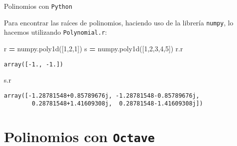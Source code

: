 \documentclass[
  ignorenonframetext,
]{beamer}
\newenvironment{Shaded}{\begin{snugshade}}{\end{snugshade}}
\newcommand{\DecValTok}[1]{\textcolor[rgb]{0.00,0.00,0.81}{#1}}
\newcommand{\NormalTok}[1]{#1}
\newcommand{\OperatorTok}[1]{\textcolor[rgb]{0.81,0.36,0.00}{\textbf{#1}}}
\begin{document}
\begin{frame}[fragile]{Polinomios con \texttt{Python}}
\protect\hypertarget{polinomios-con-python-11}{}

Para encontrar las raíces de polinomios, haciendo uso de la librería
\texttt{numpy}, lo hacemos utilizando \texttt{Polynomial.r}:

\begin{Shaded}
\begin{Highlighting}[]
\NormalTok{r }\OperatorTok{=}\NormalTok{ numpy.poly1d([}\DecValTok{1}\NormalTok{,}\DecValTok{2}\NormalTok{,}\DecValTok{1}\NormalTok{]) }
\NormalTok{s }\OperatorTok{=}\NormalTok{ numpy.poly1d([}\DecValTok{1}\NormalTok{,}\DecValTok{2}\NormalTok{,}\DecValTok{3}\NormalTok{,}\DecValTok{4}\NormalTok{,}\DecValTok{5}\NormalTok{])}
\NormalTok{r.r}
\end{Highlighting}
\end{Shaded}

\begin{verbatim}
array([-1., -1.])
\end{verbatim}

\begin{Shaded}
\begin{Highlighting}[]
\NormalTok{s.r}
\end{Highlighting}
\end{Shaded}

\begin{verbatim}
array([-1.28781548+0.85789676j, -1.28781548-0.85789676j,
        0.28781548+1.41609308j,  0.28781548-1.41609308j])
\end{verbatim}

\end{frame}

\hypertarget{polinomios-con-octave}{%
\section{\texorpdfstring{Polinomios con
\texttt{Octave}}{Polinomios con Octave}}\label{polinomios-con-octave}}
\end{document}
